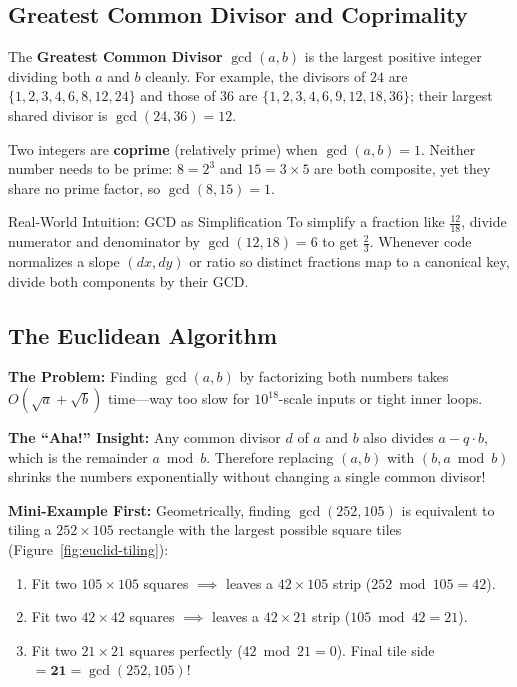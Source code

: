 \documentclass[11pt,a4paper]{article}
\theoremstyle{definition}
\newcommand{\painbeat}{\textbf{\color{accentamber}The Problem:} }
\newcommand{\ahabeat}{\textbf{\color{accentteal}The ``Aha!'' Insight:} }
\newcommand{\examplebeat}{\textbf{\color{primaryblue}Mini-Example First:} }
\begin{document}
\subsection{Greatest Common Divisor and Coprimality}

The \textbf{Greatest Common Divisor} $\gcd(a, b)$ is the largest positive integer dividing both $a$ and $b$ cleanly. For example, the divisors of $24$ are $\{1,2,3,4,6,8,12,24\}$ and those of $36$ are $\{1,2,3,4,6,9,12,18,36\}$; their largest shared divisor is $\gcd(24, 36) = 12$.

Two integers are \textbf{coprime} (relatively prime) when $\gcd(a, b) = 1$. Neither number needs to be prime: $8 = 2^3$ and $15 = 3 \times 5$ are both composite, yet they share no prime factor, so $\gcd(8, 15) = 1$.

\begin{calloutbox}{Real-World Intuition: GCD as Simplification}
To simplify a fraction like $\frac{12}{18}$, divide numerator and denominator by $\gcd(12, 18) = 6$ to get $\frac{2}{3}$. Whenever code normalizes a slope $(dx, dy)$ or ratio so distinct fractions map to a canonical key, divide both components by their GCD.
\end{calloutbox}

\subsection{The Euclidean Algorithm}

\painbeat Finding $\gcd(a, b)$ by factorizing both numbers takes $O(\sqrt{a} + \sqrt{b})$ time---way too slow for $10^{18}$-scale inputs or tight inner loops.

\ahabeat Any common divisor $d$ of $a$ and $b$ also divides $a - q \cdot b$, which is the remainder $a \bmod b$. Therefore replacing $(a, b)$ with $(b, a \bmod b)$ shrinks the numbers exponentially without changing a single common divisor!

\examplebeat Geometrically, finding $\gcd(252, 105)$ is equivalent to tiling a $252 \times 105$ rectangle with the largest possible square tiles (Figure~\ref{fig:euclid-tiling}):
\begin{enumerate}
    \item Fit two $105 \times 105$ squares $\implies$ leaves a $42 \times 105$ strip ($252 \bmod 105 = 42$).
    \item Fit two $42 \times 42$ squares $\implies$ leaves a $42 \times 21$ strip ($105 \bmod 42 = 21$).
    \item Fit two $21 \times 21$ squares perfectly ($42 \bmod 21 = 0$). Final tile side $= \mathbf{21} = \gcd(252, 105)$!
\end{enumerate}
\end{document}
